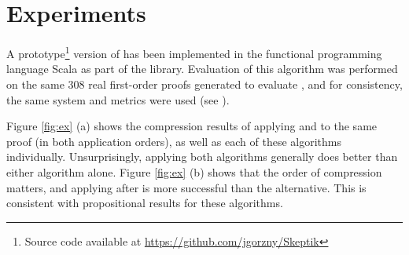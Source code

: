 \section{Experiments} \label{sec:exp}
A prototype\footnote{Source code available at \url{https://github.com/jgorzny/Skeptik}} version of {\FORPI} has been implemented in the functional programming language Scala as part of the \skeptik
 library. %
Evaluation of this algorithm was performed on the same 308 real first-order proofs generated to evaluate {\GFOLU}, and for consistency, the same system and metrics were used (see \cite{}).

Figure \ref{fig:ex} (a) shows the compression results of applying {\FORPI} and {\GFOLU} to the same proof (in both application orders), as well as each of these algorithms individually. Unsurprisingly, applying both algorithms generally does better than either algorithm alone. Figure \ref{fig:ex} (b) shows that the order of compression matters, and applying {\FORPI} after {\GFOLU} is more successful than the alternative. This is consistent with propositional results for these algorithms.




